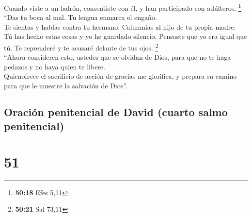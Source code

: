  Cuando viste a un ladrón, consentiste con él, y han
participado con adúlteros. \footnote{\textbf{50:18} Efes 5,11}\\
 ``Das tu boca al mal. Tu lengua enmarca el engaño.\\
 Te sientas y hablas contra tu hermano. Calumnias al hijo
de tu propia madre.\\
 Tú has hecho estas cosas y yo he guardado silencio.
Pensaste que yo era igual que tú. Te reprenderé y te acusaré delante de
tus ojos. \footnote{\textbf{50:21} Sal 73,11}\\
 ``Ahora consideren esto, ustedes que se olvidan de Dios,
para que no te haga pedazos y no haya quien te libere.\\
 Quienofrece el sacrificio de acción de gracias me
glorifica, y prepara su camino para que le muestre la salvación de
Dios''.

\hypertarget{oraciuxf3n-penitencial-de-david-cuarto-salmo-penitencial}{%
\subsection{Oración penitencial de David (cuarto salmo
penitencial)}\label{oraciuxf3n-penitencial-de-david-cuarto-salmo-penitencial}}

\hypertarget{section-49}{%
\section{51}\label{section-49}}

